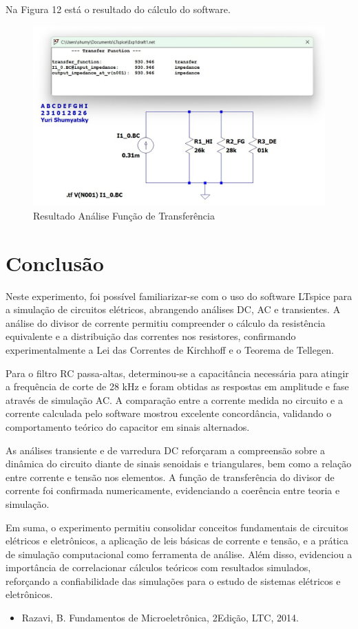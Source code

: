 \documentclass[10pt,twocolumn,letterpaper]{article}
\begin{document}
Na Figura 12 está o resultado do cálculo do software. 

\begin{figure}[h]
\caption{Resultado Análise Função de Transferência}
\includegraphics[scale=0.2]{figuras/fig12}
\end{figure}
\section{Conclusão}

Neste experimento, foi possível familiarizar-se com o uso do software LTspice para a simulação de circuitos elétricos, abrangendo análises DC, AC e transientes. A análise do divisor de corrente permitiu compreender o cálculo da resistência equivalente e a distribuição das correntes nos resistores, confirmando experimentalmente a Lei das Correntes de Kirchhoff e o Teorema de Tellegen.

Para o filtro RC passa-altas, determinou-se a capacitância necessária para atingir a frequência de corte de 28 kHz e foram obtidas as respostas em amplitude e fase através de simulação AC. A comparação entre a corrente medida no circuito e a corrente calculada pelo software mostrou excelente concordância, validando o comportamento teórico do capacitor em sinais alternados.

As análises transiente e de varredura DC reforçaram a compreensão sobre a dinâmica do circuito diante de sinais senoidais e triangulares, bem como a relação entre corrente e tensão nos elementos. A função de transferência do divisor de corrente foi confirmada numericamente, evidenciando a coerência entre teoria e simulação.


Em suma, o experimento permitiu consolidar conceitos fundamentais de circuitos elétricos e eletrônicos, a aplicação de leis básicas de corrente e tensão, e a prática de simulação computacional como ferramenta de análise. Além disso, evidenciou a importância de correlacionar cálculos teóricos com resultados simulados, reforçando a confiabilidade das simulações para o estudo de sistemas elétricos e eletrônicos.

{\small


}

\begin{itemize}
\item Razavi, B. Fundamentos de Microeletrônica, 2\textordfeminine Edição, LTC, 2014.
\end{itemize}
\end{document}
